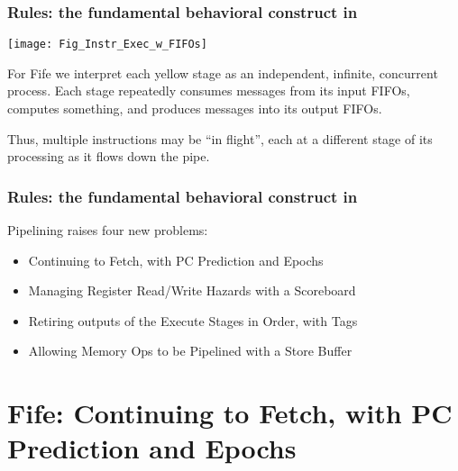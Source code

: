 \begin{frame}[fragile]
\frametitle{Rules: the fundamental behavioral construct in {\BSV}}

\footnotesize

\begin{center}
 \texttt{[image: Fig\_Instr\_Exec\_w\_FIFOs]}
\end{center}

For Fife we interpret each yellow stage as an independent, infinite,
concurrent process.  Each stage repeatedly consumes messages from its
input FIFOs, computes something, and produces messages into its output
FIFOs.

\vspace{1ex}

Thus, multiple instructions may be ``in flight'', each at a different
stage of its processing as it flows down the pipe.

\end{frame}


\begin{frame}[fragile]
\frametitle{Rules: the fundamental behavioral construct in {\BSV}}

\footnotesize

Pipelining raises four new problems:

\vspace{2ex}

\begin{itemize}

  \item Continuing to Fetch, with PC Prediction and Epochs

  \item Managing Register Read/Write Hazards with a Scoreboard

  \item Retiring outputs of the Execute Stages in Order, with Tags

  \item Allowing Memory Ops to be Pipelined with a Store Buffer

\end{itemize}


\end{frame}


\section{Fife: Continuing to Fetch, with PC Prediction and Epochs}

